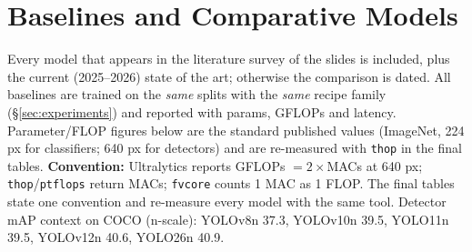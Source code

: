 \section{Baselines and Comparative Models}
\label{sec:baselines}

Every model that appears in the literature survey of the slides is included, plus the current (2025--2026) state of the art; otherwise the comparison is dated. All baselines are trained on the \emph{same} splits with the \emph{same} recipe family (\S\ref{sec:experiments}) and reported with params, GFLOPs and latency. Parameter/FLOP figures below are the standard published values (ImageNet, 224 px for classifiers; 640 px for detectors) and are re-measured with \texttt{thop} in the final tables. \textbf{Convention:} Ultralytics reports GFLOPs $=2\times$MACs at 640 px; \texttt{thop}/\texttt{ptflops} return MACs; \texttt{fvcore} counts 1 MAC as 1 FLOP. The final tables state one convention and re-measure every model with the same tool. Detector mAP context on COCO (n-scale): YOLOv8n 37.3, YOLOv10n 39.5, YOLO11n 39.5, YOLOv12n 40.6, YOLO26n 40.9.

